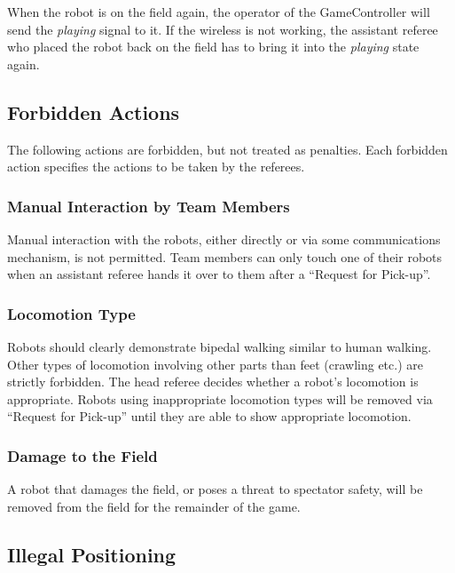 \documentclass[12pt]{article}
\begin{document}
When the robot is on the field again, the operator of the GameController will send the \emph{playing} signal to it. If the wireless is not working, the assistant referee who placed the robot back on the field has to bring it into the \emph{playing} state again.


\subsection{Forbidden Actions}

The following actions are forbidden, but not treated as penalties.
Each forbidden action specifies the actions to be taken by the referees.

\subsubsection{Manual Interaction by Team Members}

Manual interaction with the robots, either directly or via some communications mechanism, is not permitted.
Team members can only touch one of their robots when an assistant referee hands it over to them after a ``Request for Pick-up''.

\subsubsection{Locomotion Type}
\label{sec:locomotion_type}

Robots should clearly demonstrate bipedal walking similar to human walking. Other types of locomotion involving other parts than feet (crawling etc.) are strictly forbidden.
The head referee decides whether a robot's locomotion is appropriate. Robots using inappropriate locomotion types will be removed via ``Request for Pick-up'' until they are able to show appropriate locomotion.

\subsubsection{Damage to the Field}
\label{sec:damage}

A robot that damages the field, or poses a threat to spectator safety, will be removed from the field for the remainder of the game.

\subsection{Illegal Positioning}
\label{sec:illegal_positioning}
\end{document}

